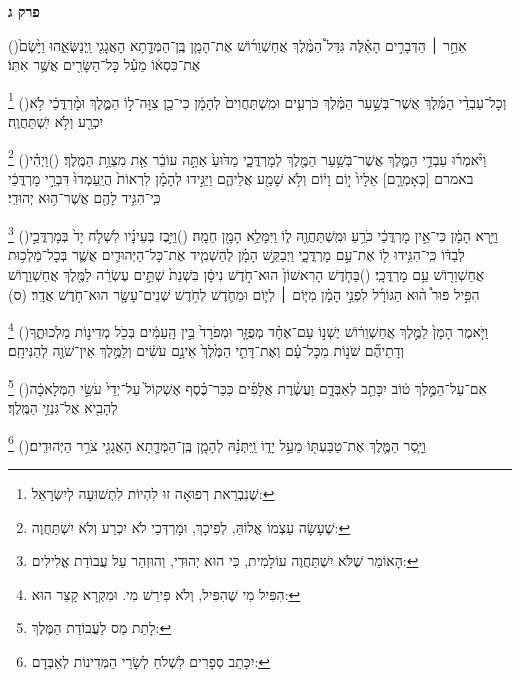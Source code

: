 \documentclass[12pt, openany]{book}
\newcommand{\chapname}{}
\newcommand{\newchap}[1]{
	\addcontentsline{toc}{chapter}{#1}
	\renewcommand{\chapname}{#1}
		\begin{center}
			\textbf{%
\fontsize{16pt}{16pt}\selectfont
				#1}
		\end{center}
}
\newcommand{\footnotecomment}[1]{
	\renewcommand\thefootnote{}
	\footnote{\textsf{#1}}}
\newcommand{\commenta}[1]{\footnotecomment{#1}\hspace{0em}}
\newcommand{\vsnum}[1]{(\hebrewnumeral{#1})\space}
\begin{document}
\newchap{פרק ג}
\begin{multicols}{2}
\vsnum{1}אַחַ֣ר ׀ הַדְּבָרִ֣ים הָאֵ֗לֶּה גִּדַּל֩ הַמֶּ֨לֶךְ אֲחַשְׁוֵר֜וֹשׁ אֶת־הָמָ֧ן בֶּֽן־הַמְּדָ֛תָא הָאֲגָגִ֖י וַֽיְנַשְּׂאֵ֑הוּ וַיָּ֙שֶׂם֙ אֶת־כִּסְא֔וֹ מֵעַ֕ל כָּל־הַשָּׂרִ֖ים אֲשֶׁ֥ר אִתּֽוֹ׃%
\commenta{ שֶׁנִבְרֵאת רְפוּאָה זוּ לִהְיוֹת לִתְשׁוּעָה לְיִשְׂרָאֵל: }%
\vsnum{2}וְכָל־עַבְדֵ֨י הַמֶּ֜לֶךְ אֲשֶׁר־בְּשַׁ֣עַר הַמֶּ֗לֶךְ כֹּרְעִ֤ים וּמִֽשְׁתַּחֲוִים֙ לְהָמָ֔ן כִּי־כֵ֖ן צִוָּה־ל֣וֹ הַמֶּ֑לֶךְ וּמָ֨רְדֳּכַ֔י לֹ֥א יִכְרַ֖ע וְלֹ֥א יִֽשְׁתַּחֲוֶֽה׃%
\commenta{ שֶׁעָשָׂה עַצְמוֹ אֱלוֹהַּ, לְפִיכָךְ, וּמָרְדְּכַי לֹא יִכְרַע וְלֹא יִשְׁתַּחֲוֶה: }%
\vsnum{3}וַיֹּ֨אמְר֜וּ עַבְדֵ֥י הַמֶּ֛לֶךְ אֲשֶׁר־בְּשַׁ֥עַר הַמֶּ֖לֶךְ לְמָרְדֳּכָ֑י מַדּ֙וּעַ֙ אַתָּ֣ה עוֹבֵ֔ר אֵ֖ת מִצְוַ֥ת הַמֶּֽלֶךְ׃
\vsnum{4}וַיְהִ֗י באמרם [כְּאָמְרָ֤ם] אֵלָיו֙ י֣וֹם וָי֔וֹם וְלֹ֥א שָׁמַ֖ע אֲלֵיהֶ֑ם וַיַּגִּ֣ידוּ לְהָמָ֗ן לִרְאוֹת֙ הֲיַֽעַמְדוּ֙ דִּבְרֵ֣י מָרְדֳּכַ֔י כִּֽי־הִגִּ֥יד לָהֶ֖ם אֲשֶׁר־ה֥וּא יְהוּדִֽי׃%
\commenta{ הָאוֹמֵר שֶׁלֹּא יִשְׁתַּחֲוֶה עוֹלָמִית, כִּי הוּא יְהוּדִי, וְהוּזְהַר עַל עֲבוֹדַת אֱלִילִים: }%
\vsnum{5}וַיַּ֣רְא הָמָ֔ן כִּי־אֵ֣ין מָרְדֳּכַ֔י כֹּרֵ֥עַ וּמִֽשְׁתַּחֲוֶ֖ה ל֑וֹ וַיִּמָּלֵ֥א הָמָ֖ן חֵמָֽה׃
\vsnum{6}וַיִּ֣בֶז בְּעֵינָ֗יו לִשְׁלֹ֤ח יָד֙ בְּמָרְדֳּכַ֣י לְבַדּ֔וֹ כִּֽי־הִגִּ֥ידוּ ל֖וֹ אֶת־עַ֣ם מָרְדֳּכָ֑י וַיְבַקֵּ֣שׁ הָמָ֗ן לְהַשְׁמִ֧יד אֶת־כָּל־הַיְּהוּדִ֛ים אֲשֶׁ֛ר בְּכָל־מַלְכ֥וּת אֲחַשְׁוֵר֖וֹשׁ עַ֥ם מָרְדֳּכָֽי׃
\vsnum{7}בַּחֹ֤דֶשׁ הָרִאשׁוֹן֙ הוּא־חֹ֣דֶשׁ נִיסָ֔ן בִּשְׁנַת֙ שְׁתֵּ֣ים עֶשְׂרֵ֔ה לַמֶּ֖לֶךְ אֲחַשְׁוֵר֑וֹשׁ הִפִּ֣יל פּוּר֩ ה֨וּא הַגּוֹרָ֜ל לִפְנֵ֣י הָמָ֗ן מִיּ֧וֹם ׀ לְי֛וֹם וּמֵחֹ֛דֶשׁ לְחֹ֥דֶשׁ שְׁנֵים־עָשָׂ֖ר הוּא־חֹ֥דֶשׁ אֲדָֽר׃ (ס)%
\commenta{ הִפִּיל מִי שֶׁהִפִּיל, וְלֹא פִּירֵשׁ מִי. וּמִקְרָא קָצֵר הוּא: }%
\vsnum{8}וַיֹּ֤אמֶר הָמָן֙ לַמֶּ֣לֶךְ אֲחַשְׁוֵר֔וֹשׁ יֶשְׁנ֣וֹ עַם־אֶחָ֗ד מְפֻזָּ֤ר וּמְפֹרָד֙ בֵּ֣ין הָֽעַמִּ֔ים בְּכֹ֖ל מְדִינ֣וֹת מַלְכוּתֶ֑ךָ וְדָתֵיהֶ֞ם שֹׁנ֣וֹת מִכָּל־עָ֗ם וְאֶת־דָּתֵ֤י הַמֶּ֙לֶךְ֙ אֵינָ֣ם עֹשִׂ֔ים וְלַמֶּ֥לֶךְ אֵין־שֹׁוֶ֖ה לְהַנִּיחָֽם׃%
\commenta{ לָתֵת מַס לַעֲבוֹדַת הַמֶּלֶךְ:}%
\vsnum{9}אִם־עַל־הַמֶּ֣לֶךְ ט֔וֹב יִכָּתֵ֖ב לְאַבְּדָ֑ם וַעֲשֶׂ֨רֶת אֲלָפִ֜ים כִּכַּר־כֶּ֗סֶף אֶשְׁקוֹל֙ עַל־יְדֵי֙ עֹשֵׂ֣י הַמְּלָאכָ֔ה לְהָבִ֖יא אֶל־גִּנְזֵ֥י הַמֶּֽלֶךְ׃%
\commenta{ יִכָּתֵב סְפָרִים לִשְׁלֹחַ לְשָׂרֵי הַמְּדִינוֹת לְאַבְּדָם:}%
\vsnum{10}וַיָּ֧סַר הַמֶּ֛לֶךְ אֶת־טַבַּעְתּ֖וֹ מֵעַ֣ל יָד֑וֹ וַֽיִּתְּנָ֗הּ לְהָמָ֧ן בֶּֽן־הַמְּדָ֛תָא הָאֲגָגִ֖י צֹרֵ֥ר הַיְּהוּדִֽים׃%

\end{multicols}
\end{document}
